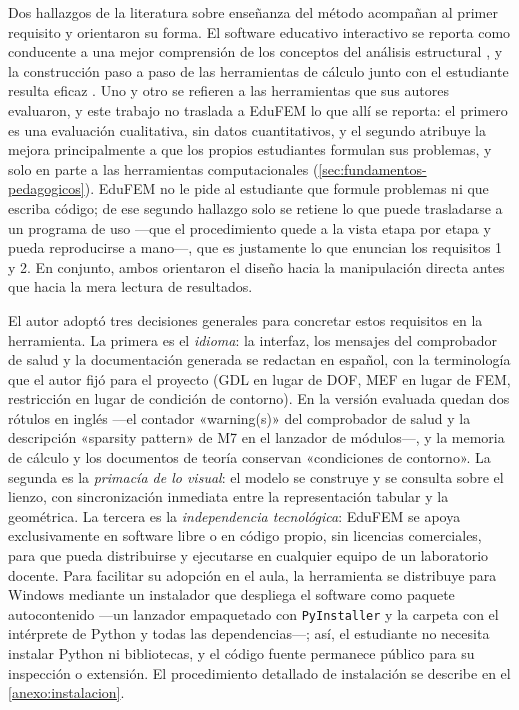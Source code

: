 Dos hallazgos de la literatura sobre enseñanza del método acompañan al primer requisito y orientaron su forma. El software educativo interactivo se reporta como conducente a una mejor comprensión de los conceptos del análisis estructural \autocite[p.~168]{lee2015interactive}, y la construcción paso a paso de las herramientas de cálculo junto con el estudiante resulta eficaz \autocite[p.~1023]{bishay2020teaching}. Uno y otro se refieren a las herramientas que sus autores evaluaron, y este trabajo no traslada a EduFEM lo que allí se reporta: el primero es una evaluación cualitativa, sin datos cuantitativos, y el segundo atribuye la mejora principalmente a que los propios estudiantes formulan sus problemas, y solo en parte a las herramientas computacionales (\autoref{sec:fundamentos-pedagogicos}). EduFEM no le pide al estudiante que formule problemas ni que escriba código; de ese segundo hallazgo solo se retiene lo que puede trasladarse a un programa de uso —que el procedimiento quede a la vista etapa por etapa y pueda reproducirse a mano—, que es justamente lo que enuncian los requisitos 1 y 2. En conjunto, ambos orientaron el diseño hacia la manipulación directa antes que hacia la mera lectura de resultados.

El autor adoptó tres decisiones generales para concretar estos requisitos en la herramienta. La primera es el \emph{idioma}: la interfaz, los mensajes del comprobador de salud y la documentación generada se redactan en español, con la terminología que el autor fijó para el proyecto (GDL en lugar de DOF, MEF en lugar de FEM, restricción en lugar de condición de contorno). En la versión evaluada quedan dos rótulos en inglés ---el contador «warning(s)» del comprobador de salud y la descripción «sparsity pattern» de M7 en el lanzador de módulos---, y la memoria de cálculo y los documentos de teoría conservan «condiciones de contorno». La segunda es la \emph{primacía de lo visual}: el modelo se construye y se consulta sobre el lienzo, con sincronización inmediata entre la representación tabular y la geométrica. La tercera es la \emph{independencia tecnológica}: EduFEM se apoya exclusivamente en software libre o en código propio, sin licencias comerciales, para que pueda distribuirse y ejecutarse en cualquier equipo de un laboratorio docente. Para facilitar su adopción en el aula, la herramienta se distribuye para Windows mediante un instalador que despliega el software como paquete autocontenido ---un lanzador empaquetado con \texttt{PyInstaller} y la carpeta con el intérprete de Python y todas las dependencias---; así, el estudiante no necesita instalar Python ni bibliotecas, y el código fuente permanece público para su inspección o extensión. El procedimiento detallado de instalación se describe en el \autoref{anexo:instalacion}.

